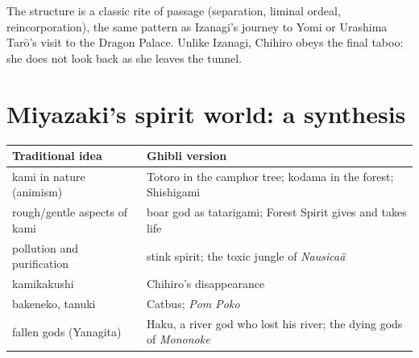 \begin{center}
\end{center}

\begin{remark}
The structure is a classic rite of passage (separation, liminal ordeal, reincorporation),
the same pattern as Izanagi's journey to Yomi or Urashima Tarō's visit to the Dragon
Palace. Unlike Izanagi, Chihiro obeys the final taboo: she does not look back as she
leaves the tunnel.
\end{remark}

\section{Miyazaki's spirit world: a synthesis}

\begin{center}
\begin{tabular}{p{3.5cm}p{9.5cm}}
\toprule
Traditional idea & Ghibli version \\
\midrule
kami in nature (animism) & Totoro in the camphor tree; kodama in the forest; Shishigami \\
rough/gentle aspects of kami & boar god as tatarigami; Forest Spirit gives and takes life \\
pollution and purification & stink spirit; the toxic jungle of \emph{Nausicaä} \\
kamikakushi & Chihiro's disappearance \\
bakeneko, tanuki & Catbus; \emph{Pom Poko} \\
fallen gods (Yanagita) & Haku, a river god who lost his river; the dying gods of \emph{Mononoke} \\
\bottomrule
\end{tabular}
\end{center}

